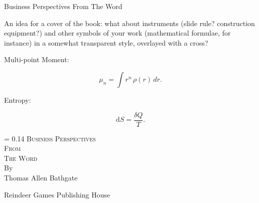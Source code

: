 \documentclass[12pt]{memoir}
\newcommand*{\plogo}{\fbox{$\mathfrak{MER}$}} %
\begin{document}

\frontmatter


\begin{titlingpage}
\thispagestyle{empty}

\begin{center}
{\Large Business Perspectives From The Word}
\end{center}

An idea for a cover of the book: what about instruments (slide rule? construction equipment?) and other symbols of your work (mathematical formulae, for instance) in a somewhat transparent style, overlayed with a cross?


Multi-point Moment:


\begin{displaymath}
\mu_n = \int r^n \, \rho(r) \, dr.
\end{displaymath}

Entropy:

\begin{displaymath}
\textrm{d}S = \frac{\delta Q}T.
\end{displaymath}

\cleardoublepage

\newlength{\drop}
\newcommand*{\titleDB}{\begingroup%
\drop = 0.14\textheight
\centering
\vspace*{\drop}
{\Huge\scshape Business Perspectives}\\[\baselineskip]
{\Huge\scshape From}\\[\baselineskip]
{\Huge\scshape The Word}\\[1.5\baselineskip]
{\large By}\\[\baselineskip]
{\LARGE Thomas Allen Bathgate}\par
\vfill
\vfill
{\small\sffamily Reindeer Games Publishing House}\\\plogo\par
\endgroup}

\thispagestyle{empty}
\titleDB
\clearpage

%
%
%
%
%
%
%



\end{titlingpage}
\end{document}
